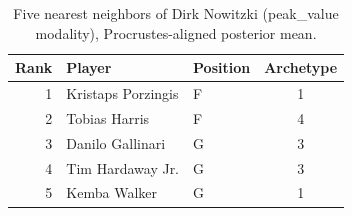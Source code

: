 \begin{table}[htbp]
  \centering\small
  \begin{tabular}{rllc}
    \toprule
    Rank & Player & Position & Archetype \\
    \midrule
    1 & Kristaps Porzingis & F & 1 \\
    2 & Tobias Harris & F & 4 \\
    3 & Danilo Gallinari & G & 3 \\
    4 & Tim Hardaway Jr. & G & 3 \\
    5 & Kemba Walker & G & 1 \\
    \bottomrule
  \end{tabular}
  \caption{Five nearest neighbors of Dirk Nowitzki (peak_value modality), Procrustes-aligned posterior mean.}
  \label{tab:Dirk_Nowitzki_neighbors_peak_value}
\end{table}

